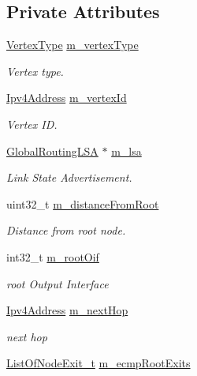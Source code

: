 \subsection*{Private Attributes}
\begin{DoxyCompactItemize}
\item 
\hyperlink{classns3_1_1SPFVertex_a20f8a4cfc99a1b7ecd10a23151b93afd}{Vertex\+Type} \hyperlink{classns3_1_1SPFVertex_af2b0b127b4e6830d836a85506943e9fb}{m\+\_\+vertex\+Type}
\begin{DoxyCompactList}\small\item\em Vertex type. \end{DoxyCompactList}\item 
\hyperlink{classns3_1_1Ipv4Address}{Ipv4\+Address} \hyperlink{classns3_1_1SPFVertex_adb37c35d8a95e05cc72bb9f8821dc3d3}{m\+\_\+vertex\+Id}
\begin{DoxyCompactList}\small\item\em Vertex ID. \end{DoxyCompactList}\item 
\hyperlink{classns3_1_1GlobalRoutingLSA}{Global\+Routing\+L\+SA} $\ast$ \hyperlink{classns3_1_1SPFVertex_a5f64e98f7b9df501b92b454c471ea861}{m\+\_\+lsa}
\begin{DoxyCompactList}\small\item\em Link State Advertisement. \end{DoxyCompactList}\item 
uint32\+\_\+t \hyperlink{classns3_1_1SPFVertex_ab4e836176a21fc534eec7ca0b382caa6}{m\+\_\+distance\+From\+Root}
\begin{DoxyCompactList}\small\item\em Distance from root node. \end{DoxyCompactList}\item 
int32\+\_\+t \hyperlink{classns3_1_1SPFVertex_aa6261717badceedb17b565549a86f14d}{m\+\_\+root\+Oif}
\begin{DoxyCompactList}\small\item\em root Output Interface \end{DoxyCompactList}\item 
\hyperlink{classns3_1_1Ipv4Address}{Ipv4\+Address} \hyperlink{classns3_1_1SPFVertex_a1012ff41d6143a2d4fb467b5bf2fbfab}{m\+\_\+next\+Hop}
\begin{DoxyCompactList}\small\item\em next hop \end{DoxyCompactList}\item 
\hyperlink{classns3_1_1SPFVertex_a58c08273e2ed8ce059f70c6afcf89e3f}{List\+Of\+Node\+Exit\+\_\+t} \hyperlink{classns3_1_1SPFVertex_af019baf41705f205801379189ada7085}{m\+\_\+ecmp\+Root\+Exits}

\end{DoxyCompactItemize}
